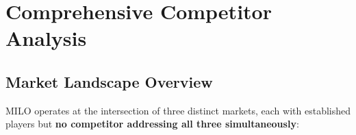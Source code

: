 \documentclass[11pt,a4paper]{report}
\begin{document}
\chapter{Comprehensive Competitor Analysis}

\section{Market Landscape Overview}

MILO operates at the intersection of three distinct markets, each with established players but \textbf{no competitor addressing all three simultaneously}:
\end{document}
